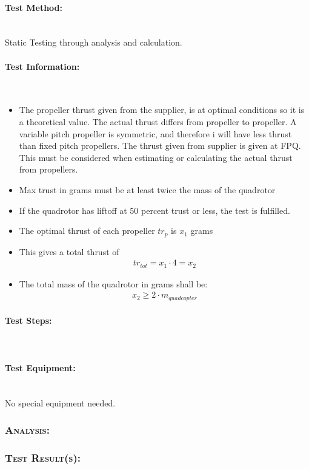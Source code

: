 \paragraph{Test Method:}\mbox{}\\
Static Testing through analysis and calculation.

\paragraph{Test Information:}\mbox{}\\
\begin{itemize}
\item  The propeller thrust given from the supplier, is at optimal conditions so it is a theoretical value. The actual thrust differs from propeller to propeller. A variable pitch propeller is symmetric, and therefore i will have less thrust than fixed pitch propellers. The thrust given from supplier is given at FPQ. This must be considered when estimating or calculating the actual thrust from propellers.
\item Max trust in grams must be at least twice the mass of the quadrotor
\item If the quadrotor has liftoff at 50 percent trust or less, the test is fulfilled.
\item The optimal thrust of each propeller $tr_p$ is $x_1$ grams
\item This gives a total thrust of
    \begin{equation}
    \begin{split}
        tr_{tot} = x_1\cdot4 = x_2
    \end{split}
    \end{equation}
\item The total mass of the quadrotor in  grams shall be:
    \begin{equation}
    \begin{split}
        x_2 \geq 2\cdot m_{quadcopter} 
    \end{split}
    \end{equation}
\end{itemize}
\paragraph{Test Steps:}\mbox{}\\
\paragraph{Test Equipment:}\mbox{}\\
No special equipment needed.
\subsubsection{\textsc{\medium Analysis:}}
\subsubsection{\textsc{\medium Test Result(s):}}
\newpage